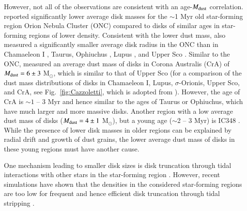 \documentclass{aa}
\newcommand{\Fig}[1]{Fig.~\ref{fig:#1}}    %
\begin{document}
However, not all of the observations are consistent with an age-$M_{\rm dust}$ correlation. \citet{Eisner2018} reported significantly lower average disk masses for the $\sim$1 Myr old star-forming region Orion Nebula Cluster (ONC) \citep{Prosser1994,Hillenbrand1997} compared to disks of similar ages in star-forming regions of lower density. 
Consistent with the lower dust mass, \citet{Eisner2018} also measured a significantly smaller average disk radius in the ONC than in Chamaeleon I \citep{Pascucci2016}, Taurus, Ophiuchus \citep{Tripathi2017}, Lupus \citep{Tazzari2017}, and Upper Sco \citep{Barenfeld2017}.  
Similar to the ONC, \citet{Cazzoletti2019} measured an average dust mass of disks in Corona Australis (CrA) of $M_{\rm dust}=6\pm3$ M$_{\odot}$, which is similar to that of Upper Sco (for a comparison of the dust mass distributions of disks in Chamaeleon I, Lupus, $\sigma$-Orionis, Upper Sco, and CrA, see \Fig{Cazzoletti}, which is adopted from \cite{Cazzoletti2019}). 
However, the age of CrA is $\sim1$ -- 3 Myr and hence similar to the ages of Taurus or Ophiuchus, which have much larger and more massive disks. 
Another region with a low average dust mass of disks ($M_{\rm dust}=4\pm1$ M$_{\odot}$), but a young age ($\sim$2 -- 3 Myr) is IC348 \citep{Ruiz-Rodriguez2018}. 
While the presence of lower disk masses in older regions can be explained by radial drift and growth of dust grains, the lower average dust mass of disks in these young regions must have another cause. 

One mechanism leading to smaller disk sizes is disk truncation through tidal interactions with other stars in the star-forming region \citep{ClarkePringle1993,Ostriker1994,Pfalzner2005}.
However, recent simulations have shown that the densities in the considered star-forming regions are too low for frequent and hence efficient disk truncation through tidal stripping \citep{Winter2018a}. 
\end{document}
